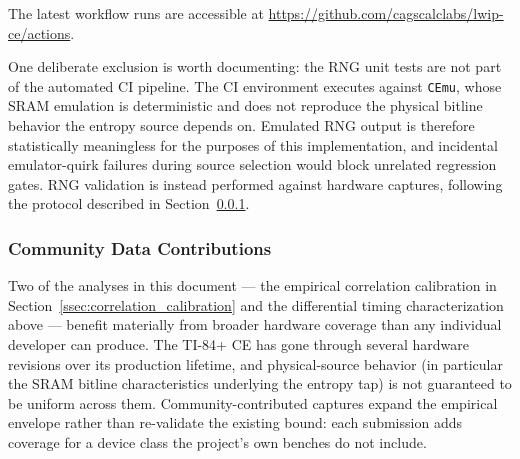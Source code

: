 \documentclass[titlepage]{report}
\begin{document}
	The latest workflow runs are accessible at \url{https://github.com/cagscalclabs/lwip-ce/actions}.

	One deliberate exclusion is worth documenting: the RNG unit tests are not part of the automated CI pipeline. The CI environment executes against \texttt{CEmu}, whose SRAM emulation is deterministic and does not reproduce the physical bitline behavior the entropy source depends on. Emulated RNG output is therefore statistically meaningless for the purposes of this implementation, and incidental emulator-quirk failures during source selection would block unrelated regression gates. RNG validation is instead performed against hardware captures, following the protocol described in Section~\ref{ssec:contributing_data}.

	\subsubsection{Community Data Contributions}
	\label{ssec:contributing_data}

	Two of the analyses in this document --- the empirical correlation calibration in Section~\ref{ssec:correlation_calibration} and the differential timing characterization above --- benefit materially from broader hardware coverage than any individual developer can produce. The TI-84+ CE has gone through several hardware revisions over its production lifetime, and physical-source behavior (in particular the SRAM bitline characteristics underlying the entropy tap) is not guaranteed to be uniform across them. Community-contributed captures expand the empirical envelope rather than re-validate the existing bound: each submission adds coverage for a device class the project's own benches do not include.
\end{document}
